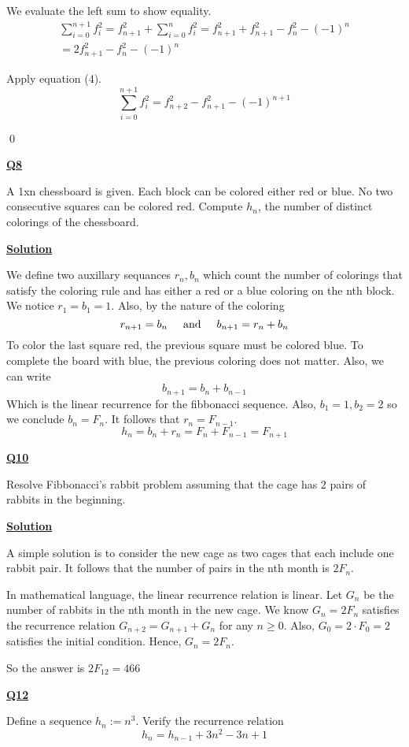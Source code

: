 \documentclass{article}
\newcommand{\new}[1]{
    \vspace{2mm}
    \noindent
    \textbf{
    \underline{#1}}
}
\newcommand{\textAnd}{
    {
        \hspace{5mm}
        \textrm{and}
        \hspace{5mm}
    }
}
\newcommand{\m}{
    \cdot
}
\begin{document}
We evaluate the left sum to show equality. 
\[
    \begin{split}
    \sum_{i = 0}^{n + 1} f_i^2 = 
 f_{n + 1}^2  + 
    \sum_{i = 0}^{n} f_i^2 
    = 
 f_{n + 1}^2  + 
 f_{n + 1}^2 - f_n^2 - (-1)^n
    \\=    
 2f_{n + 1}^2 - f_n^2 - (-1)^n
    \end{split}
\]

Apply equation (4). 
\[
    \sum_{i = 0}^{n + 1} f_i ^2= f_{n + 2}^2 - f_{n + 1}^2 - (-1)^{n + 1}
\]

\hfill \qed

\new{Q8} 
A 1xn chessboard is given. Each block can 
be colored either red or blue. No two consecutive 
squares can be colored red. Compute $h_n$, the number 
of distinct colorings of the chessboard. 

\new{Solution} 
We define two auxillary sequances $r_n, b_n$ 
which count the number of colorings that satisfy the 
coloring rule and has either a red or a blue coloring 
on the nth block. We notice $r_1 = b_1 = 1$. 
Also, by the nature of the coloring 
\[
    r_{n+1} = b_n \textAnd b_{n + 1} = r_n + b_n
\]
To color the last square red, the previous square 
must be colored blue. To complete the board with blue, 
the previous coloring does not matter. Also, we can write 
\[
    b_{n + 1} = b_n + b_{n - 1}
\]
Which is the linear recurrence for the fibbonacci sequence. 
Also, $b_1 = 1, b_2 = 2$ so we conclude $b_n = F_n$. It 
follows that $r_n = F_{n - 1}$. 
\[
    \boxed{
    h_n = b_n + r_n = F_n + F_{n - 1} = F_{n + 1}
    }
\]

\new{Q10} 
Resolve Fibbonacci's rabbit problem assuming that the 
cage has 2 pairs of rabbits in the beginning. 

\new{Solution}
A simple solution is to consider the new cage 
as two cages that each include one rabbit pair. It follows 
that the number of pairs in the nth month is $2F_n$. 

In mathematical language, the linear recurrence relation 
is linear. Let $G_n$ be the number of rabbits in the nth 
month in the new cage. We know $G_n = 2F_n$ satisfies the 
recurrence relation $G_{n + 2} = G_{n + 1} + G_n$ for 
any $n \geq 0$. Also, $G_0 = 2\m F_0 = 2$ satisfies 
the initial condition. Hence, $G_n = 2F_n$. 

So the answer is 
$\boxed{2F_{12} = 466}$

\new{Q12}
Define a sequence $h_n := n^3$. Verify the recurrence 
relation 
\[
    h_n =  h_{n - 1} + 3n^2 - 3n + 1
\]
\end{document}
